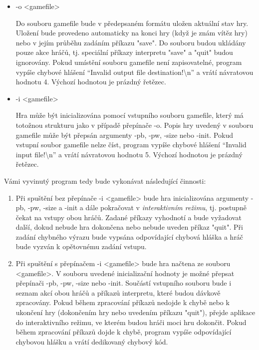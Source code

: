 \documentclass[
12pt,
a4paper,
pdftex,
czech,
titlepage
]{report}
\begin{document}
\begin{itemize}[label={}]
\item -o <gamefile>
\hspace{1.05cm} \begin{minipage}[t]{0.7\textwidth} Do souboru gamefile bude v předepsaném formátu uložen aktuální stav
hry. Uložení bude provedeno automaticky na konci hry (když je znám vítěz hry) nebo v jejím průběhu zadáním příkazu "save". Do souboru budou
ukládány pouze akce hráčů, tj. speciální příkazy interpretu "save" a "quit"
budou ignorovány. Pokud umístění souboru gamefile není zapisovatelné,
program vypíše chybové hlášení ``Invalid output file destination!\textbackslash n''
a vrátí návratovou hodnotu 4. Výchozí hodnotou je prázdný řetězec.
\end{minipage}
\item -i <gamefile>
\hspace{1.1cm} \begin{minipage}[t]{0.7\textwidth}  Hra může být inicializována pomocí vstupního souboru gamefile, který
má totožnou strukturu jako v případě přepínače -o. Popis hry uvedený
v souboru gamefile může být přepsán argumenty -pb, -pw, -size nebo
-init. Pokud vstupní soubor gamefile nelze číst, program vypíše chybové
hlášení 
``Invalid input file!\textbackslash n'' a vrátí návratovou hodnotu 5. Výchozí
hodnotou je prázdný řetězec.
\end{minipage}
\end{itemize}

Vámi vyvinutý program tedy bude vykonávat následující činnosti:

\begin{enumerate}[label=\arabic*.]
\item Při spuštění bez přepínače -i <gamefile> bude hra inicializována argumenty -pb, -pw,
-size a -init a dále pokračovat v \textit{interaktivním režimu}, tj. postupně čekat na vstupy obou
hráčů. Zadané příkazy vyhodnotí a bude vyžadovat další, dokud nebude hra dokončena
nebo nebude uveden příkaz "quit". Při zadání chybného výrazu bude vypsána odpovídající
chybová hláška a hráč bude vyzván k opětovnému zadání vstupu.
\item Při spuštění s přepínačem -i <gamefile> bude hra načtena ze souboru <gamefile>. V souboru uvedené inicializační hodnoty je možné přepsat přepínači -pb, -pw, -size nebo -init.
Součástí vstupního souboru bude i seznam akcí obou hráčů a příkazů interpretu, které budou
dávkově zpracovány. Pokud během zpracování příkazů nedojde k chybě nebo k ukončení hry
(dokončením hry nebo uvedením příkazu "quit"), přejde aplikace do interaktivního režimu,
ve kterém budou hráči moci hru dokončit. Pokud během zpracování příkazů dojde k chybě,
program vypíše odpovídající chybovou hlášku a vrátí dedikovaný chybový kód.
\end{enumerate}
\end{document}
